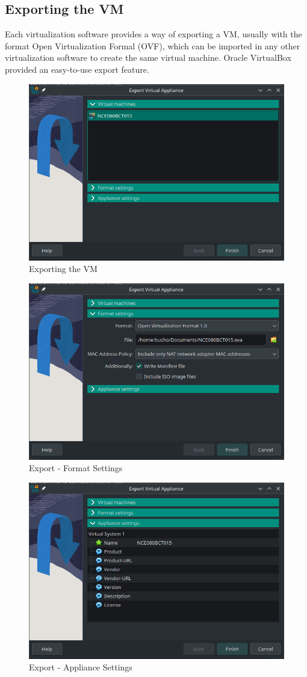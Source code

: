 \documentclass[a4paper,12pt]{report}
\begin{document}
\subsection{Exporting the VM}
Each virtualization software provides a way of exporting a VM, usually with the format Open Virtualization Formal (OVF)\footnotemark[1], which can be imported in any other virtualization software to create the same virtual machine.
Oracle VirtualBox provided an easy-to-use export feature.
\begin{figure}[h]
    \centering
    \includegraphics[width=0.5\linewidth]{export.png}
    \caption{Exporting the VM}
    \label{fig24}
\end{figure}
\newpage
\begin{figure}[h]
    \centering
    \includegraphics[width=0.5\linewidth]{export2.png}
    \caption{Export - Format Settings}
    \label{fig25}
\end{figure}
\begin{figure}[h]
    \centering
    \includegraphics[width=0.5\linewidth]{export3.png}
    \caption{Export - Appliance Settings}
    \label{fig26}
\end{figure}
\newpage
\end{document}
